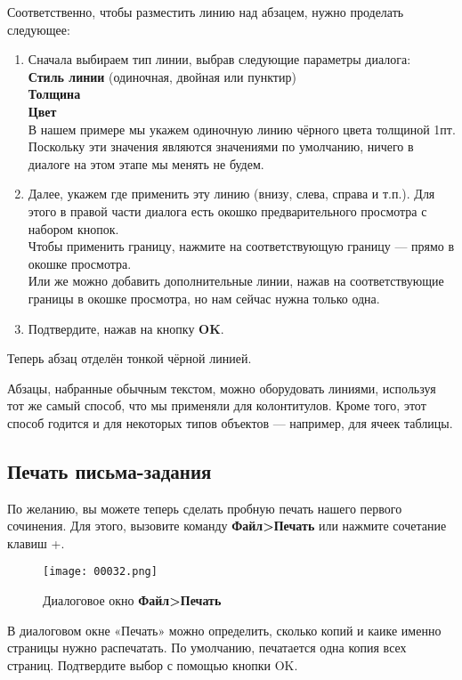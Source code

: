 ﻿\documentclass[a4paper,10pt]{article}
\begin{document}
Соответственно, чтобы разместить линию над абзацем, нужно проделать следующее:
\begin{enumerate}
 \item Сначала выбираем тип линии, выбрав следующие параметры диалога:\\
\textbf{Стиль линии} (одиночная, двойная или пунктир)\\
\textbf{Толщина}\\
\textbf{Цвет}\\
В нашем примере мы укажем одиночную линию чёрного цвета толщиной 1пт.\\
Поскольку эти значения являются значениями по умолчанию, ничего в диалоге на этом этапе мы менять не будем.
\item Далее, укажем где применить эту линию (внизу, слева, справа и т.п.). Для этого в правой части диалога есть окошко предварительного просмотра с набором кнопок.\\
Чтобы применить границу, нажмите на соответствующую границу — прямо в окошке просмотра.\\
Или же можно добавить дополнительные линии, нажав на соответствующие границы в окошке просмотра, но нам сейчас нужна только одна.
\item Подтвердите, нажав на кнопку \textbf{OK}.
\end{enumerate}

Теперь абзац отделён тонкой чёрной линией.

Абзацы, набранные обычным текстом, можно оборудовать линиями, используя тот же самый способ, что мы применяли для колонтитулов. Кроме того, этот способ годится и для некоторых типов объектов — например, для ячеек таблицы.

\subsection{Печать письма-задания}
По желанию, вы можете теперь сделать пробную печать нашего первого сочинения. Для этого, вызовите команду \textbf{Файл>Печать} или нажмите сочетание клавиш +.

\begin{figure}[ht]
\texttt{[image: 00032.png]}
\centering
\caption{Диалоговое окно \textbf{Файл>Печать}}
\end{figure}

В диалоговом окне «Печать» можно определить, сколько копий и каике именно страницы нужно распечатать. По умолчанию, печатается одна копия всех страниц. Подтвердите выбор с помощью кнопки OK. 
\end{document}
